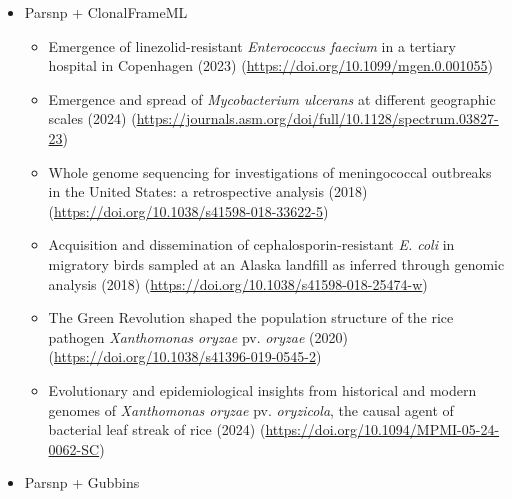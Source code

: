 \documentclass[
]{book}
\providecommand{\tightlist}{%
  \setlength{\itemsep}{0pt}\setlength{\parskip}{0pt}}
\begin{document}
\begin{itemize}
\tightlist
\item
  Parsnp + ClonalFrameML

  \begin{itemize}
  \tightlist
  \item
    Emergence of linezolid-resistant \emph{Enterococcus faecium} in a tertiary hospital in Copenhagen (2023) (\url{https://doi.org/10.1099/mgen.0.001055})
  \item
    Emergence and spread of \emph{Mycobacterium ulcerans} at different geographic scales (2024) (\url{https://journals.asm.org/doi/full/10.1128/spectrum.03827-23})
  \item
    Whole genome sequencing for investigations of meningococcal outbreaks in the United States: a retrospective analysis (2018) (\url{https://doi.org/10.1038/s41598-018-33622-5})
  \item
    Acquisition and dissemination of cephalosporin-resistant \emph{E. coli} in migratory birds sampled at an Alaska landfill as inferred through genomic analysis (2018) (\url{https://doi.org/10.1038/s41598-018-25474-w})
  \item
    The Green Revolution shaped the population structure of the rice pathogen \emph{Xanthomonas oryzae} pv. \emph{oryzae} (2020) (\url{https://doi.org/10.1038/s41396-019-0545-2})
  \item
    Evolutionary and epidemiological insights from historical and modern genomes of \emph{Xanthomonas oryzae} pv. \emph{oryzicola}, the causal agent of bacterial leaf streak of rice (2024) (\url{https://doi.org/10.1094/MPMI-05-24-0062-SC})
  \end{itemize}
\item
  Parsnp + Gubbins


\end{itemize}
\end{document}
